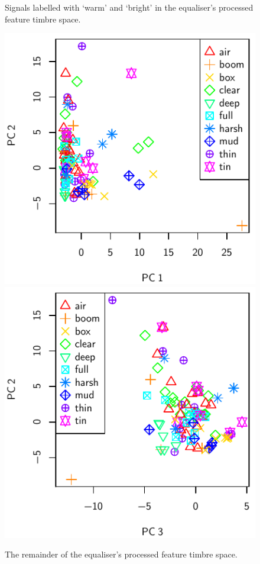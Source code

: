 \begin{figure}[h!]
{					\label{fig:EqualiserProcessedPCA3-2}
				}
				\caption{Signals labelled with `warm' and `bright' in the equaliser's processed
					 feature timbre space.}
				\label{fig:EqualiserBWProcessedPCAs}
			\end{figure}

			\begin{figure}[h!]
				\centering
				\subfloat
				{
					\includegraphics{chapter4/Images/EqualiserProcessedPCA1-2.pdf}
					\label{fig:EqualiserProcessedPCA1-2}
				}
				\quad
				\subfloat
				{
					\includegraphics{chapter4/Images/EqualiserProcessedPCA3-2.pdf}
					\label{fig:EqualiserProcessedPCA3-2}
				}
				\caption{The remainder of the equaliser's processed feature timbre space.}
				\label{fig:EqualiserProcessedPCAs}
			\end{figure}


